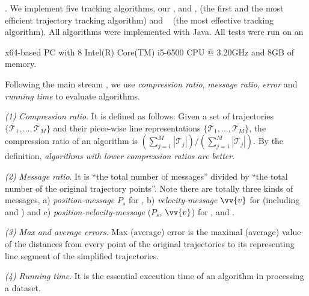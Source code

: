 .
We implement five tracking algorithms, \ie our \citt, \sitt and \bitt, \ldrh \cite{Trajcevski:LDRH} (the first and the most efficient trajectory tracking algorithm) and \grts~\cite{Lange:GRTS,Lange:Tracking} (the most effective tracking algorithm).
All algorithms were implemented with Java.
All tests were run on an {x64-based  PC with 8 Intel(R) Core(TM) i5-6500 CPU @ 3.20GHz and 8GB of memory.
	
Following the main stream \cite{Trajcevski:LDRH, Lange:GRTS, Lange:Tracking, Lin:Cised, Zhang:Evaluation}, we use \emph{compression ratio}, \emph{message ratio}, \emph{error} and \emph{running time} to evaluate algorithms.

 \ni \emph{(1) Compression ratio}. {It is defined as follows: Given a set of trajectories $\{\dddot{\mathcal{T}_1}, \ldots, \dddot{\mathcal{T}_M}\}$ and their piece-wise line representations $\{\overline{\mathcal{T}_1}, \ldots, \overline{\mathcal{T}_M}\}$, the compression ratio of an algorithm is $(\sum_{j=1}^{M} |\overline{\mathcal{T}}_j |)/(\sum_{j=1}^{M} |\dddot{\mathcal{T}}_j |)$.
	By the definition, \emph{algorithms with lower compression ratios are better}.}

 \ni \emph{(2) Message ratio}. It is ``the total number of messages'' divided by ``the total number of the original trajectory points''. Note there are totally three kinds of messages, \ie a) \emph{position-message} $P_s$ for \grts, b) \emph{velocity-message} $\vv{v}$ for \bitt (including \citt and \sitt) and c) \emph{position-velocity-message} ($P_s$, $\vv{v}$) for \ldrh, \grts and \bitt. 
 

 \ni \emph{(3) Max and average errors}. Max (average) error is the maximal (average) value of the distances from every point of the original trajectories to its representing line segment of the simplified trajectories.
 
 \ni \emph{(4) Running time}. It is the essential execution time of an algorithm in processing a dataset.
 



}
